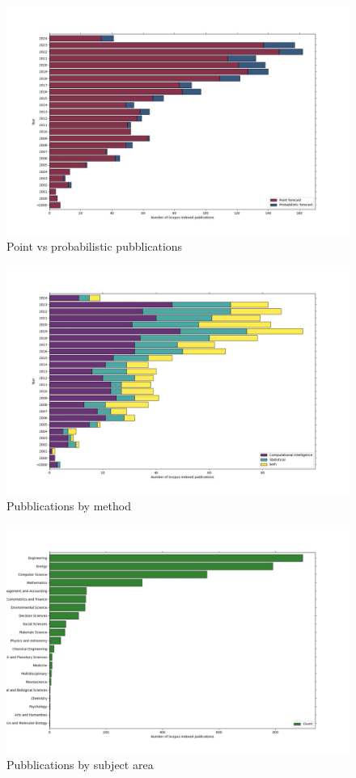 \begin{figure}[h!]
  \includegraphics[width=\textwidth]{images/point_vs_prob.jpg}
  \caption{Point vs probabilistic pubblications}
  \label{fig:point_vs_prob}
\end{figure}

\begin{figure}[h!]
  \includegraphics[width=\textwidth]{images/cs_stat_both.jpg}
  \caption{Pubblications by method}
  \label{fig:point_vs_prob}
\end{figure}


\begin{figure}[h!]
  \includegraphics[width=\textwidth]{images/subject_area.jpg}
  \caption{Pubblications by subject area}
  \label{fig:subject_area}
\end{figure}


